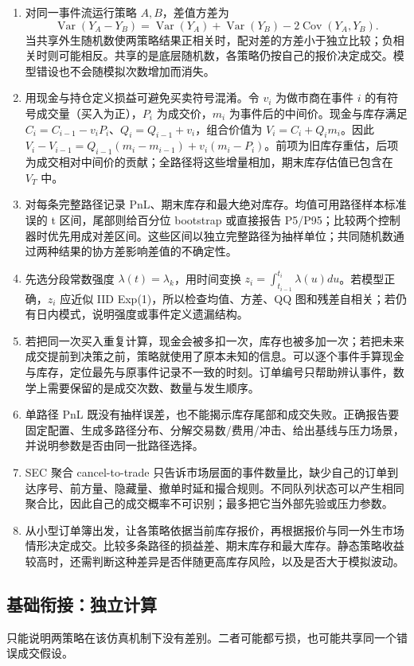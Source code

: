 
\begin{enumerate}[leftmargin=*]
  \item 对同一事件流运行策略 $A,B$，差值方差为
  \[
  \operatorname{Var}(Y_A-Y_B)=\operatorname{Var}(Y_A)+\operatorname{Var}(Y_B)-2\operatorname{Cov}(Y_A,Y_B).
  \]
  当共享外生随机数使两策略结果正相关时，配对差的方差小于独立比较；负相关时则可能相反。共享的是底层随机数，各策略仍按自己的报价决定成交。模型错设也不会随模拟次数增加而消失。
  \item 用现金与持仓定义损益可避免买卖符号混淆。令 $v_i$ 为做市商在事件 $i$ 的有符号成交量（买入为正），$P_i$ 为成交价，$m_i$ 为事件后的中间价。现金与库存满足 $C_i=C_{i-1}-v_iP_i$、$Q_i=Q_{i-1}+v_i$，组合价值为 $V_i=C_i+Q_im_i$。因此 $V_i-V_{i-1}=Q_{i-1}(m_i-m_{i-1})+v_i(m_i-P_i)$。前项为旧库存重估，后项为成交相对中间价的贡献；全路径将这些增量相加，期末库存估值已包含在 $V_T$ 中。
  \item 对每条完整路径记录 PnL、期末库存和最大绝对库存。均值可用路径样本标准误的 t 区间，尾部则给百分位 bootstrap 或直接报告 P5/P95；比较两个控制器时优先用成对差区间。这些区间以独立完整路径为抽样单位；共同随机数通过两种结果的协方差影响差值的不确定性。
  \item 先选分段常数强度 $\lambda(t)=\lambda_k$，用时间变换 $z_i=\int_{t_{i-1}}^{t_i}\lambda(u)du$。若模型正确，$z_i$ 应近似 IID Exp(1)，所以检查均值、方差、QQ 图和残差自相关；若仍有日内模式，说明强度或事件定义遗漏结构。
  \item 若把同一次买入重复计算，现金会被多扣一次，库存也被多加一次；若把未来成交提前到决策之前，策略就使用了原本未知的信息。可以逐个事件手算现金与库存，定位最先与原事件记录不一致的时刻。订单编号只帮助辨认事件，数学上需要保留的是成交次数、数量与发生顺序。
  \item 单路径 PnL 既没有抽样误差，也不能揭示库存尾部和成交失败。正确报告要固定配置、生成多路径分布、分解交易数/费用/冲击、给出基线与压力场景，并说明参数是否由同一批路径选择。
  \item SEC 聚合 cancel-to-trade 只告诉市场层面的事件数量比，缺少自己的订单到达序号、前方量、隐藏量、撤单时延和撮合规则。不同队列状态可以产生相同聚合比，因此自己的成交概率不可识别；最多把它当外部先验或压力参数。
  \item 从小型订单簿出发，让各策略依据当前库存报价，再根据报价与同一外生市场情形决定成交。比较多条路径的损益差、期末库存和最大库存。静态策略收益较高时，还需判断这种差异是否伴随更高库存风险，以及是否大于模拟波动。
\end{enumerate}

\subsection*{基础衔接：独立计算}
只能说明两策略在该仿真机制下没有差别。二者可能都亏损，也可能共享同一个错误成交假设。
